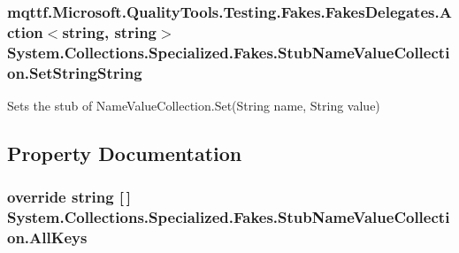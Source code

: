\hypertarget{class_system_1_1_collections_1_1_specialized_1_1_fakes_1_1_stub_name_value_collection_a05c7ff4cb3723fc9815cd843988faa9a}{
\subsubsection[{Set\-String\-String}]{\setlength{\rightskip}{0pt plus 5cm}mqttf.\-Microsoft.\-Quality\-Tools.\-Testing.\-Fakes.\-Fakes\-Delegates.\-Action$<$string, string$>$ System.\-Collections.\-Specialized.\-Fakes.\-Stub\-Name\-Value\-Collection.\-Set\-String\-String}}\label{class_system_1_1_collections_1_1_specialized_1_1_fakes_1_1_stub_name_value_collection_a05c7ff4cb3723fc9815cd843988faa9a}


Sets the stub of Name\-Value\-Collection.\-Set(\-String name, String value)



\subsection{Property Documentation}
\hypertarget{class_system_1_1_collections_1_1_specialized_1_1_fakes_1_1_stub_name_value_collection_acd469dd9f1f03ca591b7c9a5fda8595d}{
\subsubsection[{All\-Keys}]{\setlength{\rightskip}{0pt plus 5cm}override string \mbox{[}$\,$\mbox{]} System.\-Collections.\-Specialized.\-Fakes.\-Stub\-Name\-Value\-Collection.\-All\-Keys\hspace{0.3cm}{\ttfamily [get]}}}\label{class_system_1_1_collections_1_1_specialized_1_1_fakes_1_1_stub_name_value_collection_acd469dd9f1f03ca591b7c9a5fda8595d}


